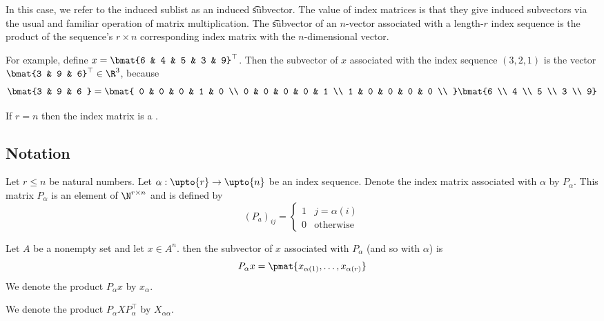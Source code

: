 In this case, we refer to the induced sublist as an induced \t{subvector}.
The value of index matrices is that they give induced subvectors via the usual and familiar operation of matrix multiplication.
The \t{subvector} of an $n$-vector associated with a length-$r$ index sequence is the product of the sequence's $r \times  n$ corresponding index matrix with the $n$-dimensional vector.

For example, define $x = \bmat{6 & 4 & 5 & 3 & 9}^\top $.
Then the subvector of $x$ associated with the index sequence $(3, 2, 1)$ is the vector $\bmat{3 & 9 & 6}^\top  \in \R ^3$, because
    \[
\bmat{3 & 9 & 6 } =
\bmat{
0 & 0 & 0 & 1 & 0 \\
0 & 0 & 0 & 0 & 1 \\
1 & 0 & 0 & 0 & 0 \\
}\bmat{6 \\ 4 \\ 5 \\ 3 \\ 9}
    \]

If $r = n$ then the index matrix is a .

\subsection*{Notation}

Let $r \leq n$ be natural numbers.
Let $\alpha : \upto{r} \to \upto{n}$ be an index sequence.
Denote the index matrix associated with $\alpha $ by $P_\alpha $.
This matrix $P_\alpha $ is an element of $\N  ^{r \times  n}$ and is defined by
    \[
(P_a)_{ij} = \begin{cases}
1 & j = \alpha (i) \\
0 & \text{otherwise}
\end{cases}
    \]

Let $A$ be a nonempty set and let $x \in A^n$.
then the subvector of $x$ associated with $P_\alpha $ (and so with $\alpha $) is
    \[
P_\alpha  x = \pmat{x_{\alpha (1)}, \dots , x_{\alpha (r)}}
    \]
We denote the product $P_\alpha x$ by $x_{\alpha }$.

We denote the product $P_\alpha  X P_\alpha ^\top $ by $X_{\alpha \alpha }$.
